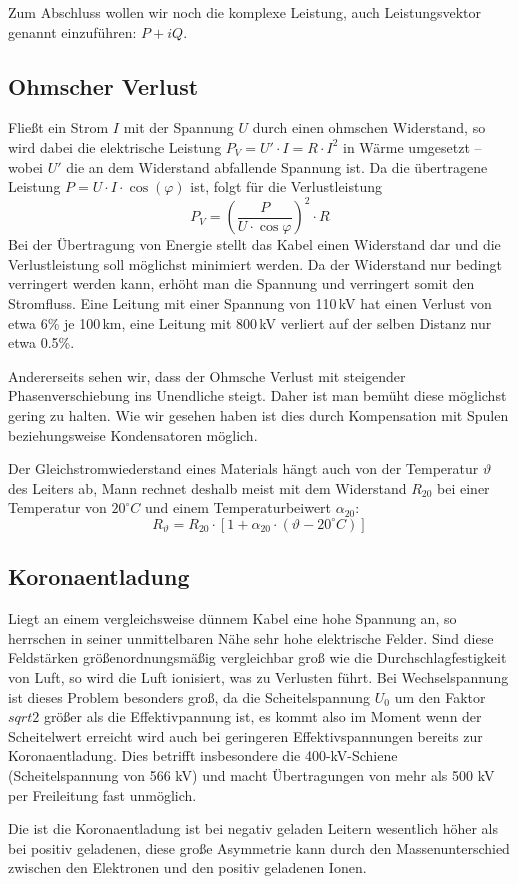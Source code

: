 Zum Abschluss wollen wir noch die komplexe Leistung, auch Leistungsvektor genannt einzuführen: $P+i Q$.

\subsection{Ohmscher Verlust}
Fließt ein Strom $I$ mit der Spannung $U$ durch einen ohmschen Widerstand, so wird dabei die elektrische Leistung
$P_V = U' \cdot I = R \cdot I^2$
in Wärme umgesetzt -- wobei $U'$ die an dem Widerstand abfallende Spannung ist.
Da die übertragene Leistung $P=U \cdot I \cdot \cos(\varphi)$ ist, folgt für die Verlustleistung
\begin{equation}\label{Verlust}
P_V = \left(\frac{P}{U \cdot \cos\varphi}\right)^2\cdot R
\end{equation}
Bei der Übertragung von Energie stellt das Kabel einen Widerstand dar und die Verlustleistung soll möglichst minimiert werden. Da der Widerstand nur bedingt verringert werden kann, erhöht man die Spannung und verringert somit den Stromfluss. Eine Leitung mit einer Spannung von 110\,kV hat einen Verlust von etwa 6\% je 100\,km, eine Leitung mit 800\,kV verliert auf der selben Distanz nur etwa 0.5\%.

Andererseits sehen wir, dass der Ohmsche Verlust mit steigender Phasenverschiebung ins Unendliche steigt. Daher ist man bemüht diese möglichst gering zu halten. Wie wir gesehen haben ist dies durch Kompensation mit Spulen beziehungsweise Kondensatoren möglich.

Der Gleichstromwiederstand eines Materials hängt auch von der Temperatur $\vartheta$ des Leiters ab, Mann rechnet deshalb meist mit dem Widerstand $R_{20}$ bei einer Temperatur von $20^\circ C$ und einem Temperaturbeiwert $\alpha_{20}$:
\begin{equation}
R_\vartheta = R_{20} \cdot \left[ 1 + \alpha_{20} \cdot \left( \vartheta - 20^\circ C \right) \right]
\end{equation}



\subsection{Koronaentladung}
Liegt an einem vergleichsweise dünnem Kabel eine hohe Spannung an, so herrschen in seiner unmittelbaren Nähe sehr hohe elektrische Felder. Sind diese Feldstärken größenordnungsmäßig vergleichbar groß wie die Durchschlagfestigkeit von Luft, so wird die Luft ionisiert, was zu Verlusten führt. Bei Wechselspannung ist dieses Problem besonders groß, da die Scheitelspannung $U_0$ um den Faktor $sqrt{2}$ größer als die Effektivpannung ist, es kommt also im Moment wenn der Scheitelwert erreicht wird auch bei geringeren Effektivspannungen bereits zur Koronaentladung. Dies betrifft insbesondere die 400-kV-Schiene (Scheitelspannung von 566 kV) und macht Übertragungen von mehr als 500 kV per Freileitung fast unmöglich.

Die ist die Koronaentladung ist bei negativ geladen Leitern wesentlich höher als bei positiv geladenen\cite{Padiyar}, diese große Asymmetrie kann durch den Massenunterschied zwischen den Elektronen und den positiv geladenen Ionen. %